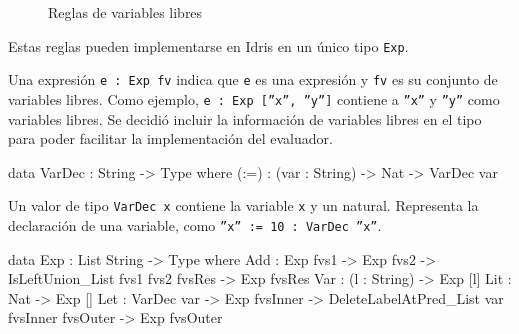 \begin{figure}[h]

\centering

\begin{subfigure}{0.5\linewidth}
\centering
{}
\end{subfigure}%

\bigskip

\begin{subfigure}{0.5\linewidth}
\centering
{}
\end{subfigure}%

\bigskip

\begin{subfigure}{0.5\linewidth}
\centering
{}
\end{subfigure}%

\bigskip

\begin{subfigure}{0.5\linewidth}
\centering
{}
\end{subfigure}%

\caption{Reglas de variables libres}
\label{fig:RulesFreeVariables}
\end{figure}

Estas reglas pueden implementarse en Idris en un único tipo \texttt{Exp}.

Una expresión \texttt{e : Exp fv} indica que \texttt{e} es una expresión y \texttt{fv} es su conjunto de variables libres. Como ejemplo, \texttt{e : Exp [''x'', ''y'']} contiene a \texttt{''x''} y \texttt{''y''} como variables libres. Se decidió incluir la información de variables libres en el tipo para poder facilitar la implementación del evaluador.

\begin{code}
data VarDec : String -> Type where
  (:=) : (var : String) -> Nat -> VarDec var
\end{code}

Un valor de tipo \texttt{VarDec x} contiene la variable \texttt{x} y un natural. Representa la declaración de una variable, como \texttt{''x'' := 10 : VarDec ''x''}.

\begin{code}
data Exp : List String -> Type where
  Add : Exp fvs1 -> Exp fvs2 ->
    IsLeftUnion_List fvs1 fvs2 fvsRes ->
    Exp fvsRes
  Var : (l : String) -> Exp [l]
  Lit : Nat -> Exp []
  Let : VarDec var -> Exp fvsInner ->
    DeleteLabelAtPred_List var fvsInner fvsOuter ->
    Exp fvsOuter
\end{code}


